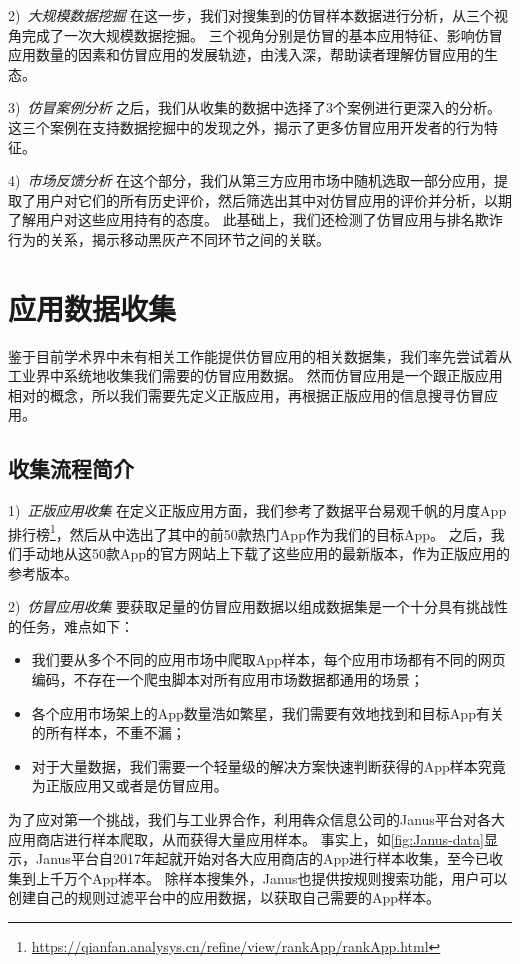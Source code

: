 2)\ \emph{大规模数据挖掘} \quad
在这一步，我们对搜集到的仿冒样本数据进行分析，从三个视角完成了一次大规模数据挖掘。
三个视角分别是仿冒的基本应用特征、影响仿冒应用数量的因素和仿冒应用的发展轨迹，由浅入深，帮助读者理解仿冒应用的生态。

3)\ \emph{仿冒案例分析} \quad
之后，我们从收集的数据中选择了3个案例进行更深入的分析。
这三个案例在支持数据挖掘中的发现之外，揭示了更多仿冒应用开发者的行为特征。

4)\ \emph{市场反馈分析} \quad
在这个部分，我们从第三方应用市场中随机选取一部分应用，提取了用户对它们的所有历史评价，然后筛选出其中对仿冒应用的评价并分析，以期了解用户对这些应用持有的态度。
此基础上，我们还检测了仿冒应用与排名欺诈行为的关系，揭示移动黑灰产不同环节之间的关联。

\section{应用数据收集}
鉴于目前学术界中未有相关工作能提供仿冒应用的相关数据集，我们率先尝试着从工业界中系统地收集我们需要的仿冒应用数据。
然而仿冒应用是一个跟正版应用相对的概念，所以我们需要先定义正版应用，再根据正版应用的信息搜寻仿冒应用。

\subsection{收集流程简介}
1)\ \emph{正版应用收集} \quad
在定义正版应用方面，我们参考了数据平台易观千帆的月度App排行榜\footnote{\url{https://qianfan.analysys.cn/refine/view/rankApp/rankApp.html}}，然后从中选出了其中的前50款热门App作为我们的目标App。
之后，我们手动地从这50款App的官方网站上下载了这些应用的最新版本，作为正版应用的参考版本。

2)\ \emph{仿冒应用收集} \quad
要获取足量的仿冒应用数据以组成数据集是一个十分具有挑战性的任务，难点如下：
\begin{itemize}
	\item 我们要从多个不同的应用市场中爬取App样本，每个应用市场都有不同的网页编码，不存在一个爬虫脚本对所有应用市场数据都通用的场景；
	\item 各个应用市场架上的App数量浩如繁星，我们需要有效地找到和目标App有关的所有样本，不重不漏；
	\item 对于大量数据，我们需要一个轻量级的解决方案快速判断获得的App样本究竟为正版应用又或者是仿冒应用。
\end{itemize}

为了应对第一个挑战，我们与工业界合作，利用犇众信息公司的Janus平台对各大应用商店进行样本爬取，从而获得大量应用样本。
事实上，如\autoref{fig:Janus-data}显示，Janus平台自2017年起就开始对各大应用商店的App进行样本收集，至今已收集到上千万个App样本。
除样本搜集外，Janus也提供按规则搜索功能，用户可以创建自己的规则过滤平台中的应用数据，以获取自己需要的App样本。

